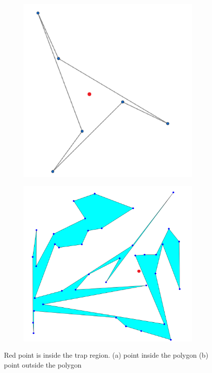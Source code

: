 \documentclass[conference]{IEEEtran}
\begin{document}
			\begin{figure}[htbp]
				\centering
				\begin{subfigure}{0.49\linewidth}
					\centering
					\includegraphics[width=0.99\textwidth]{fig3a.png}
					\caption{}
					\label{fig3a}
				\end{subfigure}
				\begin{subfigure}{0.49\linewidth}
					\centering
					\includegraphics[width=0.99\textwidth]{fig3b.png}
					\caption{}
					\label{fig3b}
				\end{subfigure}
				\caption
				{
					Red point is inside the trap region.
					(a) point inside the polygon
					(b) point outside the polygon 
				}
				\label{fig3}
			\end{figure}
	
\end{document}
